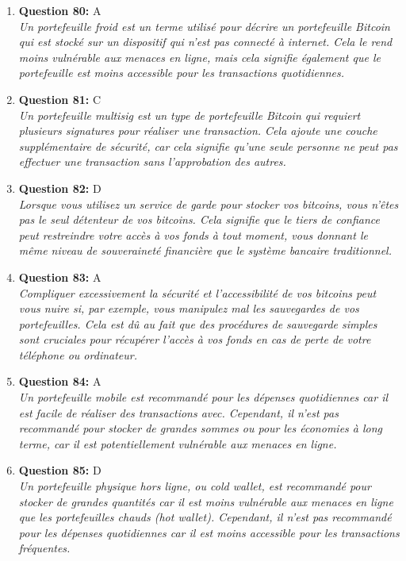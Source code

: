 \documentclass[12pt,a4paper]{article}
\begin{document}
\begin{enumerate}
\item \textbf{Question 80:} A
\\ \textit{Un portefeuille froid est un terme utilisé pour décrire un portefeuille Bitcoin qui est stocké sur un dispositif qui n'est pas connecté à internet. Cela le rend moins vulnérable aux menaces en ligne, mais cela signifie également que le portefeuille est moins accessible pour les transactions quotidiennes.}

\item \textbf{Question 81:} C
\\ \textit{Un portefeuille multisig est un type de portefeuille Bitcoin qui requiert plusieurs signatures pour réaliser une transaction. Cela ajoute une couche supplémentaire de sécurité, car cela signifie qu'une seule personne ne peut pas effectuer une transaction sans l'approbation des autres.}

\item \textbf{Question 82:} D
\\ \textit{Lorsque vous utilisez un service de garde pour stocker vos bitcoins, vous n'êtes pas le seul détenteur de vos bitcoins. Cela signifie que le tiers de confiance peut restreindre votre accès à vos fonds à tout moment, vous donnant le même niveau de souveraineté financière que le système bancaire traditionnel.}

\item \textbf{Question 83:} A
\\ \textit{Compliquer excessivement la sécurité et l'accessibilité de vos bitcoins peut vous nuire si, par exemple, vous manipulez mal les sauvegardes de vos portefeuilles. Cela est dû au fait que des procédures de sauvegarde simples sont cruciales pour récupérer l'accès à vos fonds en cas de perte de votre téléphone ou ordinateur.}

\item \textbf{Question 84:} A
\\ \textit{Un portefeuille mobile est recommandé pour les dépenses quotidiennes car il est facile de réaliser des transactions avec. Cependant, il n'est pas recommandé pour stocker de grandes sommes ou pour les économies à long terme, car il est potentiellement vulnérable aux menaces en ligne.}

\item \textbf{Question 85:} D
\\ \textit{Un portefeuille physique hors ligne, ou cold wallet, est recommandé pour stocker de grandes quantités car il est moins vulnérable aux menaces en ligne que les portefeuilles chauds (hot wallet). Cependant, il n'est pas recommandé pour les dépenses quotidiennes car il est moins accessible pour les transactions fréquentes.}


\end{enumerate}
\end{document}
